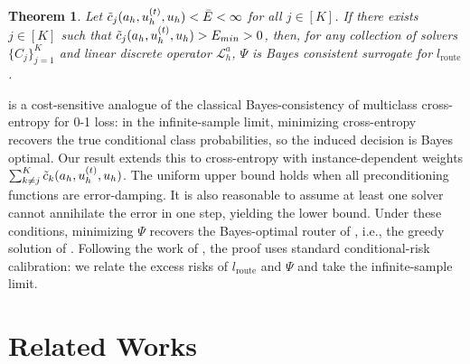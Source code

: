 \documentclass{article} %
\newtheorem{theorem}{Theorem}[section]
\newcommand\ambuj[1]{\textcolor{red}{AT: #1}}
\begin{document}
\begin{theorem} \label{th:consistency}
    Let $\Tilde{c}_j(a_h, u^{(t)}_h, u_h) < \Bar{E} < \infty$  for all $j \in [K]$. If there exists $j\in [K]$ such that $\Tilde{c}_j(a_h, u^{(t)}_h, u_h) > E_{min} > 0$, then, for any collection of solvers $\{C_j\}_{j= 1}^K$ and linear discrete operator $\mathcal{L}_h^a$, $\Psi$ is Bayes consistent surrogate for $l_{\text{route}}$.
\end{theorem}
 is a cost-sensitive analogue of the classical Bayes-consistency of multiclass cross-entropy for 0-1 loss: in the infinite-sample limit, minimizing cross-entropy recovers the true conditional class probabilities, so the induced decision is Bayes optimal. Our result extends this to cross-entropy with instance-dependent weights $\sum_{k \neq j}^K\Tilde{c}_k(a_h, u^{(t)}_h, u_h)$. The uniform upper bound holds when all preconditioning functions are error-damping. It is also reasonable to assume at least one solver cannot annihilate the error in one step, yielding the lower bound. Under these conditions, minimizing $\Psi$ recovers the Bayes-optimal router of , i.e., the greedy solution of . Following the work of \citet{mao2024regression}, the proof uses standard conditional-risk calibration: we relate the excess risks of $l_{\text{route}}$ and $\Psi$ and take the infinite-sample limit.



\section{Related Works}
\end{document}
